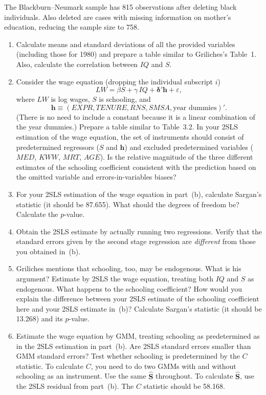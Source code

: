 \begin{problemset}
The Blackburn--Neumark sample has 815 observations after deleting black individuals.
Also deleted are cases with missing information on mother's education,
reducing the sample size to 758.

\begin{enumerate}[label=(\alph*)]
\item Calculate means and standard deviations of all the provided variables (including
  those for 1980) and prepare a table similar to Griliches's Table~1.  Also,
  calculate the correlation between $IQ$ and $S$.

\item Consider the wage equation (dropping the individual subscript $i$)
  \[
    LW = \beta S + \gamma\, IQ + \boldsymbol{\delta}'\mathbf{h} + \varepsilon,
  \]
  where $LW$ is log wages, $S$ is schooling, and
  \[
    \mathbf{h} \equiv (EXPR, TENURE, RNS, SMSA, \text{year dummies})'.
  \]
  (There is no need to include a constant because it is a linear combination of
  the year dummies.)  Prepare a table similar to Table~3.2.  In your 2SLS estimation
  of the wage equation, the set of instruments should consist of predetermined
  regressors ($S$ and $\mathbf{h}$) and excluded predetermined variables ($MED$,
  $KWW$, $MRT$, $AGE$).  Is the relative magnitude of the three different estimates
  of the schooling coefficient consistent with the prediction based on the omitted
  variable and errors-in-variables biases?

\item For your 2SLS estimation of the wage equation in part~(b), calculate Sargan's
  statistic (it should be 87.655).  What should the degrees of freedom be?  Calculate
  the $p$-value.

\item Obtain the 2SLS estimate by actually running two regressions.  Verify that the
  standard errors given by the second stage regression are \emph{different} from those
  you obtained in~(b).

\item Griliches mentions that schooling, too, may be endogenous.  What is his argument?
  Estimate by 2SLS the wage equation, treating both $IQ$ and $S$ as endogenous.
  What happens to the schooling coefficient?  How would you explain the
  difference between your 2SLS estimate of the schooling coefficient here and
  your 2SLS estimate in~(b)?  Calculate Sargan's statistic (it should be 13.268)
  and its $p$-value.

\item Estimate the wage equation by GMM, treating schooling as predetermined as in
  the 2SLS estimation in part~(b).  Are 2SLS standard errors smaller than GMM
  standard errors?  Test whether schooling is predetermined by the $C$ statistic.
  To calculate $C$, you need to do two GMMs with and without schooling as an
  instrument.  Use the same $\hat{\mathbf{S}}$ throughout.  To calculate $\hat{\mathbf{S}}$, use the 2SLS
  residual from part~(b).  The $C$ statistic should be 58.168.


\end{enumerate}
\end{problemset}
